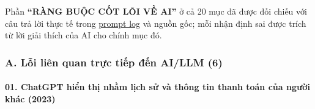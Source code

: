 Phần \textbf{``RÀNG BUỘC CỐT LÕI VỀ AI''} ở cả 20 mục đã được đối chiếu với câu trả lời thực tế trong \href{Appendix_A_Prompt_Log.md}{prompt log} và nguồn gốc; mỗi nhận định sai được trích từ lời giải thích của AI cho chính mục đó.

\subsubsection{A. Lỗi liên quan trực tiếp đến AI/LLM (6)}\label{a.-lux1ed7i-liuxean-quan-trux1ef1c-tiux1ebfp-ux111ux1ebfn-aillm-6}

\paragraph{01. ChatGPT hiển thị nhầm lịch sử và thông tin thanh toán của người khác (2023)}\label{chatgpt-hiux1ec3n-thux1ecb-nhux1ea7m-lux1ecbch-sux1eed-vuxe0-thuxf4ng-tin-thanh-touxe1n-cux1ee7a-ngux1b0ux1eddi-khuxe1c-2023}

